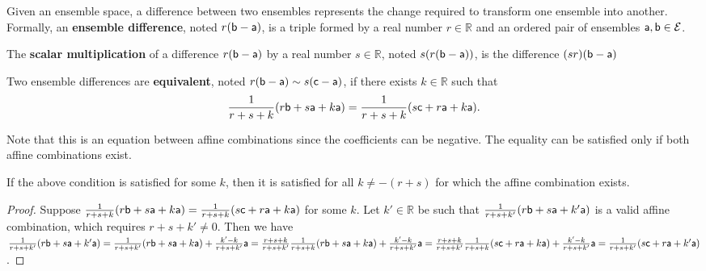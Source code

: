 \begin{mathSection}
	
	\begin{defn}
		Given an ensemble space, a difference between two ensembles represents the change required to transform one ensemble into another. Formally, an \textbf{ensemble difference}, noted $r(\ens[b] - \ens[a])$, is a triple formed by a real number $r \in \mathbb{R}$ and an ordered pair of ensembles $\ens[a],\ens[b] \in \Ens$.
	\end{defn}
	
	\begin{defn}
		The \textbf{scalar multiplication} of a difference $r(\ens[b] - \ens[a])$ by a real number $s \in \mathbb{R}$, noted $s(r(\ens[b] - \ens[a]))$, is the difference $(sr)(\ens[b] - \ens[a])$
	\end{defn}
	
	\begin{defn}
		Two ensemble differences are \textbf{equivalent}, noted $r(\ens[b] - \ens[a]) \sim s(\ens[c] - \ens[a])$, if there exists $k \in \mathbb{R}$ such that
		$$ \frac{1}{r+s+k} (r \ens[b] + s \ens[a] + k \ens[a]) = \frac{1}{r+s+k} (s \ens[c] + r \ens[a] + k \ens[a]).$$
	\end{defn}
	
	\begin{remark}
		Note that this is an equation between affine combinations since the coefficients can be negative. The equality can be satisfied only if both affine combinations exist.
	\end{remark}
	
	\begin{coro}
		If the above condition is satisfied for some $k$, then it is satisfied for all $k \neq -(r+s)$ for which the affine combination exists.
	\end{coro}
	
	\begin{proof}
		Suppose $\frac{1}{r+s+k} (r \ens[b] + s \ens[a] + k \ens[a]) = \frac{1}{r+s+k} (s \ens[c] + r \ens[a] + k \ens[a])$ for some $k$. Let $k' \in \mathbb{R}$ be such that $\frac{1}{r+s+k'} (r \ens[b] + s \ens[a] + k' \ens[a])$ is a valid affine combination, which requires $r+s+k'\neq0$. Then we have $\frac{1}{r+s+k'} (r \ens[b] + s \ens[a] + k' \ens[a]) = \frac{1}{r+s+k'} (r \ens[b] + s \ens[a] + k \ens[a]) + \frac{k'-k}{r+s+k'} \ens[a] = \frac{r+s+k}{r+s+k'} \frac{1}{r+s+k}(r \ens[b] + s \ens[a] + k \ens[a]) + \frac{k'-k}{r+s+k'} \ens[a] = \frac{r+s+k}{r+s+k'} \frac{1}{r+s+k}(s \ens[c] + r \ens[a] + k \ens[a]) + \frac{k'-k}{r+s+k'} \ens[a] = \frac{1}{r+s+k'} (s \ens[c] + r \ens[a] + k' \ens[a])$.
	\end{proof}
	

\end{mathSection}
